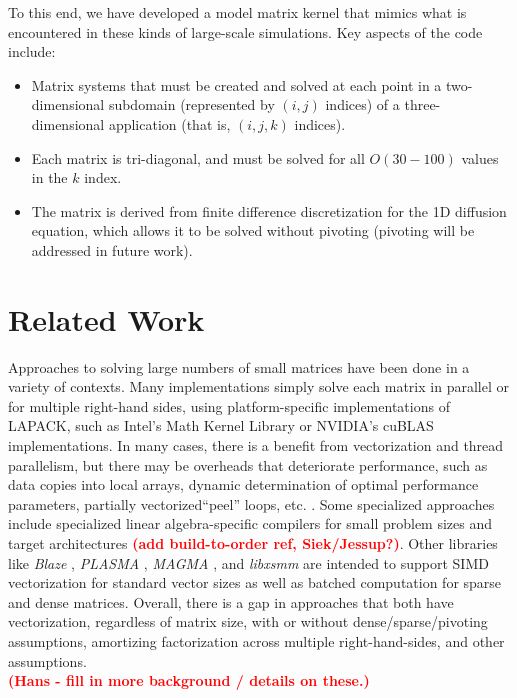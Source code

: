 \documentclass[conference]{IEEEtran}
\newcommand{\fix}[1]{{\bf \textcolor {red}{#1}}}
\begin{document}
To this end, we have developed a model matrix kernel that mimics what
  is encountered in these kinds of large-scale simulations.
Key aspects of the code include:
\begin{itemize}
\item Matrix systems that must be created and solved
  at each point in a two-dimensional subdomain (represented by $(i,j)$ indices)
  of a three-dimensional application (that is, $(i,j,k)$ indices).
\item Each matrix is tri-diagonal, and must be solved for all $O(30-100)$
  values in the $k$ index.
\item The matrix is derived from finite difference discretization for the
  1D diffusion equation, which allows it to be solved without pivoting
  (pivoting will be addressed in future work).
\end{itemize}

\section{Related Work}
Approaches to solving large numbers of small matrices have been done
  in a variety of contexts.
Many implementations simply solve each matrix in parallel or for multiple
  right-hand sides, using platform-specific
  implementations of LAPACK, such as Intel's Math Kernel Library \cite{??}
  or NVIDIA's cuBLAS \cite{??} implementations.
In many cases, there is a benefit from vectorization and thread parallelism, 
  but there may be overheads that deteriorate performance, such as data copies
  into local arrays, dynamic determination of optimal performance parameters, 
  partially vectorized``peel'' loops, etc. \cite{??}.
Some specialized approaches include specialized linear algebra-specific 
  compilers for small problem sizes and target architectures 
  \cite{Spampinato:2014, ??} \fix{(add build-to-order ref, Siek/Jessup?)}.
Other libraries like 
  \emph{Blaze} \cite{BlazeSite}, 
  \emph{PLASMA} \cite{PLASMASite},
  \emph{MAGMA} \cite{Haidar:2015}, and 
  \emph{libxsmm} \cite{??}
  are intended to support SIMD vectorization for standard vector sizes
  as well as batched computation for sparse and dense matrices.
Overall, there is a gap in approaches that both have vectorization,
  regardless of matrix size, with or without dense/sparse/pivoting 
  assumptions, amortizing factorization across multiple right-hand-sides, 
  and other assumptions.
\\
\fix{(Hans - fill in more background / details on these.)}
\end{document}
